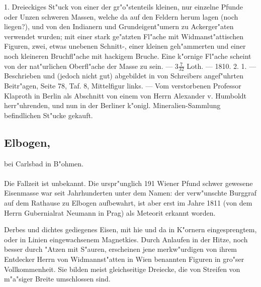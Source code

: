 \documentclass[a4paper, 11pt, oneside, polutonikogreek, german]{article}
\begin{document}
1. Dreieckiges St"uck von einer der gr"o"stenteils kleinen, nur einzelne Pfunde oder Unzen schweren Massen, welche da auf den Feldern herum lagen (noch liegen?), und von den Indianern und Grundeigent"umern zu Ackerger"aten verwendet wurden; mit einer stark ge"atzten Fl"ache mit Widmanst"attischen Figuren, zwei, etwas unebenen Schnitt-, einer kleinen geh"ammerten und einer noch kleineren Bruchfl"ache mit hackigem Bruche. Eine k"ornige Fl"ache scheint von der nat"urlichen Oberfl"ache der Masse zu sein. --- $3\frac{7}{32}$ Loth. --- 1810. 2. 1. --- Beschrieben und (jedoch nicht gut) abgebildet in von Schreibers angef"uhrten Beitr"agen, Seite 78, Taf. 8, Mittelfigur links. --- Vom verstorbenen Professor Klaproth in Berlin als Abschnitt von einem von Herrn Alexander v. Humboldt herr"uhrenden, und nun in der Berliner k"onigl. Mineralien-Sammlung befindlichen St"ucke gekauft.
\subsection[Elbogen.]{Elbogen,}
\begin{center}
\small
bei Carlsbad in B"ohmen.
\end{center}
\paragraph{}
Die Fallzeit ist unbekannt. Die urspr"unglich 191 Wiener Pfund schwer gewesene Eisenmasse war seit Jahrhunderten unter dem Namen: der verw"unschte Burggraf auf dem Rathause zu Elbogen aufbewahrt, ist aber erst im Jahre 1811 (von dem Herrn Gubernialrat Neumann in Prag) als Meteorit erkannt worden.

Derbes und dichtes gediegenes Eisen, mit hie und da in K"ornern eingesprengtem, oder in Linien eingewachsenem Magnetkies. Durch Anlaufen in der Hitze, noch besser durch "Atzen mit S"auren, erscheinen jene merkw"urdigen von ihrem Entdecker Herrn von Widmannst"atten in Wien benannten Figuren in gro"ser Vollkommenheit. Sie bilden meist gleichseitige Dreiecke, die von Streifen von m"a"siger Breite umschlossen sind.
\end{document}

